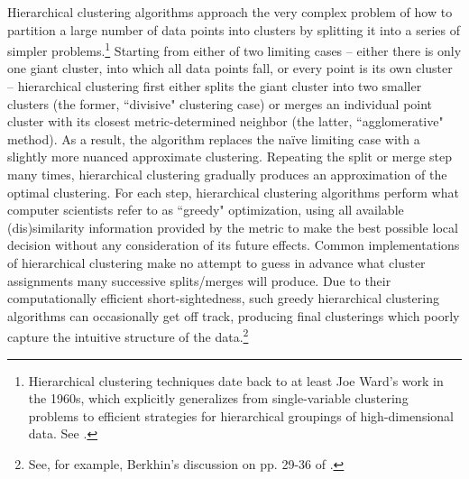 Hierarchical clustering algorithms approach the very complex problem of how to partition a large number of data points into clusters by splitting it into a series of simpler problems.\footnote{Hierarchical clustering techniques date back to at least Joe Ward's work in the 1960s, which explicitly generalizes from single-variable clustering problems to efficient strategies for hierarchical groupings of high-dimensional data.  See \cite{ward1963}.}  Starting from either of two limiting cases -- either there is only one giant cluster, into which all data points fall, or every point is its own cluster -- hierarchical clustering first either splits the giant cluster into two smaller clusters (the former, ``divisive" clustering case) or merges an individual point cluster with its closest metric-determined neighbor (the latter, ``agglomerative"  method).  As a result, the algorithm replaces the na\"{i}ve limiting case with a slightly more nuanced approximate clustering.  Repeating the split or merge step many times, hierarchical clustering gradually produces an approximation of the optimal clustering.  For each step, hierarchical clustering algorithms perform what computer scientists refer to as ``greedy" optimization, using all available (dis)similarity information provided by the metric to make the best possible local decision without any consideration of its future effects.  Common implementations of hierarchical clustering make no attempt to guess in advance what cluster assignments many successive splits/merges will produce.  Due to their computationally efficient short-sightedness, such greedy hierarchical clustering algorithms can occasionally get off track, producing final clusterings which poorly capture the intuitive structure of the data.\footnote{See, for example, Berkhin's discussion on pp. 29-36 of \cite{berkhin2006}.}

